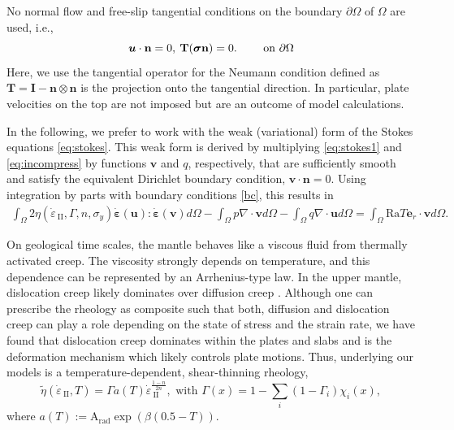\documentclass[12pt]{article}
\newcommand{\gsnote}[1]{\textcolor{blue}{GS: #1}}
\newcommand{\vrnote}[1]{\textcolor{red}{VR: #1}}
\newcommand{\IIinv}{{\dot\varepsilon}_{\mathrm{\!\!\:II}}}
\newcommand{\uu}{{\ensuremath{\boldsymbol{u}}}}
\newcommand{\vv}{{\ensuremath{\boldsymbol{v}}}}
\newcommand{\ssigma}{{\ensuremath{\boldsymbol{\sigma}}}}
\newcommand{\strain}{{\ensuremath{\dot{\boldsymbol{\varepsilon}}}}}
\begin{document}
%
No normal flow and free-slip tangential conditions on the boundary $\partial\Omega$ of $\Omega$ are
used, i.e., 
\begin{equation}
    \uu \cdot \textbf{n} = 0, \:
    \textbf{T}(\ssigma \textbf{n})=0. %
  \qquad\text{ on }\partial \Omega  \\
  \label{bc}
\end{equation}
Here, we use the tangential operator for the Neumann condition
defined as $\textbf{T}=\textbf{I}-\textbf{n}\otimes\textbf{n}$ is the
projection onto the tangential direction. In particular,  
plate velocities on the top are not imposed but are an outcome of
model calculations.

In the following, we prefer to work with the weak (variational) form
of the Stokes equations \eqref{eq:stokes}.  This weak form is derived
by multiplying \eqref{eq:stokes1} and \eqref{eq:incompress} by
functions $\vv$ and $q$, respectively, that are 
sufficiently smooth and satisfy the equivalent Dirichlet boundary
condition, $\vv\cdot\textbf{n}=0$.
Using integration by parts with boundary conditions
\eqref{bc}, this results in
\begin{multline}
\label{eq:weakStokes}
\!\!\int_{\Omega}
  \!2\eta(\IIinv,\Gamma, n, \sigma_y)\strain(\uu):\strain(\vv)d\Omega
  -\int_{\Omega} p\nabla \cdot \vv d\Omega - \int_{\Omega} q \nabla \cdot
  \uu d\Omega = \int_{\Omega}\text{Ra}T \textbf{e}_r \cdot \vv d\Omega.
\end{multline}

On geological time scales, the mantle behaves like a viscous fluid
from thermally activated creep. The viscosity strongly depends on
temperature, and this dependence can be represented by an Arrhenius-type law. In the
upper mantle, dislocation creep likely dominates over diffusion
creep \citep{stocker1973rheology}. Although one can prescribe the rheology as composite
\citep{GGGE1076,Stadler27082010} such that both, diffusion and
dislocation creep can play a
role depending on the state of stress and the strain rate, we have found
that dislocation creep dominates within the plates and slabs and
is the deformation mechanism which likely controls plate motions. Thus,
underlying our models is a temperature-dependent, shear-thinning
rheology,
\begin{equation*}
  \tilde\eta(\IIinv,T)=\Gamma a(T)\IIinv^{\frac{1-n}{2n}}, \text{ with }
  \Gamma(x) = 1 - \sum_i(1 - \Gamma_i)\chi_i(x),
\end{equation*}
where $a(T):=\text{A}_{\text{rad}}\exp(\beta(0.5-T))$. 
\end{document}

